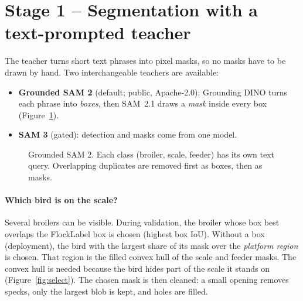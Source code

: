 \documentclass[11pt,a4paper]{article}
\begin{document}
\section{Stage 1 -- Segmentation with a text-prompted teacher}
The teacher turns short text phrases into pixel masks, so no masks have to be drawn by hand. Two interchangeable teachers are available:

\begin{itemize}[nosep]
  \item \textbf{Grounded SAM 2} (default; public, Apache-2.0): Grounding DINO turns each phrase into \emph{boxes}, then SAM~2.1 draws a \emph{mask} inside every box (Figure~\ref{fig:grounded}).
  \item \textbf{SAM 3} (gated): detection and masks come from one model.
\end{itemize}

\begin{figure}[h]
\centering
{}
\caption{Grounded SAM 2. Each class (broiler, scale, feeder) has its own text query. Overlapping duplicates are removed first as boxes, then as masks.}
\label{fig:grounded}
\end{figure}

\paragraph{Which bird is on the scale?} Several broilers can be visible. During validation, the broiler whose box best overlaps the FlockLabel box is chosen (highest box IoU). Without a box (deployment), the bird with the largest share of its mask over the \emph{platform region} is chosen. That region is the filled convex hull of the scale and feeder masks. The convex hull is needed because the bird hides part of the scale it stands on (Figure~\ref{fig:select}). The chosen mask is then cleaned: a small opening removes specks, only the largest blob is kept, and holes are filled.
\end{document}
